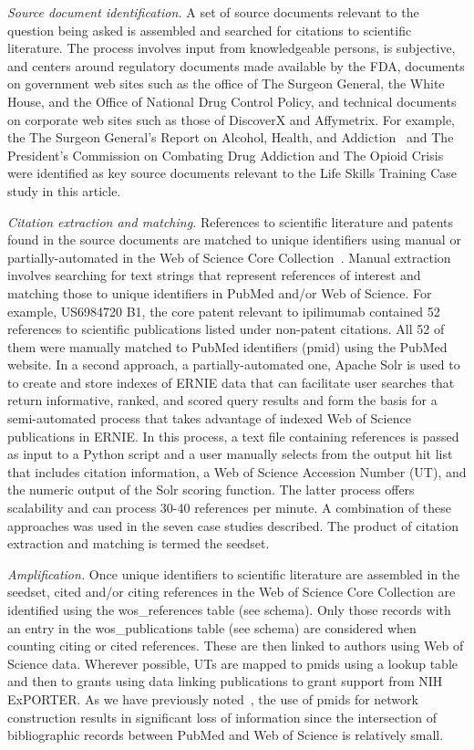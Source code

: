 \documentclass[review]{elsarticle}
\begin{document}
\emph {Source document identification.} A set of source documents relevant to the question being asked is assembled and searched for citations to scientific literature. The process involves input from knowledgeable persons, is subjective, and centers around regulatory documents made available by the FDA, documents on government web sites such as the office of The Surgeon General, the White House, and the Office of National Drug Control Policy, and technical documents on corporate web sites such as those of DiscoverX and Affymetrix. For example, the The Surgeon General's Report on Alcohol, Health, and Addiction~\cite{SurgGen2017} and The President's Commission on Combating Drug Addiction and The Opioid Crisis~\cite{PresidComm2017} were identified as key source documents relevant to the Life Skills Training Case study in this article. 

\emph {Citation extraction and matching.} References to scientific literature and patents found in the source documents are matched to unique identifiers using manual or partially-automated in the Web of Science Core Collection~\cite{Keserci2017}.  Manual extraction involves searching for text strings that represent references of interest and matching those to unique identifiers in PubMed and/or Web of Science. For example, US6984720 B1, the core patent relevant to ipilimumab contained 52 references to scientific publications listed under non-patent citations. All 52 of them were manually matched to PubMed identifiers (pmid) using the PubMed website. In a second approach, a partially-automated one, Apache Solr is used to to create and store indexes of ERNIE data that can facilitate user searches that return informative, ranked, and scored query results and form the basis for a semi-automated process that takes advantage of indexed Web of Science publications in ERNIE. In this process, a text file containing references is passed as input to a Python script and a user manually selects from the output hit list that includes citation information, a Web of Science Accession Number (UT), and the numeric output of the Solr scoring function. The latter process offers scalability and can process 30-40 references per minute. A combination of these approaches was used in the seven case studies described. The product of citation extraction and matching is termed the seedset.

\emph{Amplification.} Once unique identifiers to scientific literature are assembled in the seedset, cited and/or citing references in the Web of Science Core Collection are identified using the wos\_references table (see schema). Only those records with an entry in the wos\_publications table (see schema) are considered when counting citing or cited references. These are then linked to authors using Web of Science data. Wherever possible, UTs are mapped to pmids using a lookup table and then to grants using data linking publications to grant support from NIH ExPORTER. As we have previously noted~\cite{Keserci2017}, the use of pmids for network construction results in significant loss of information since the intersection of bibliographic records between PubMed and Web of Science is relatively small. 
\end{document}

